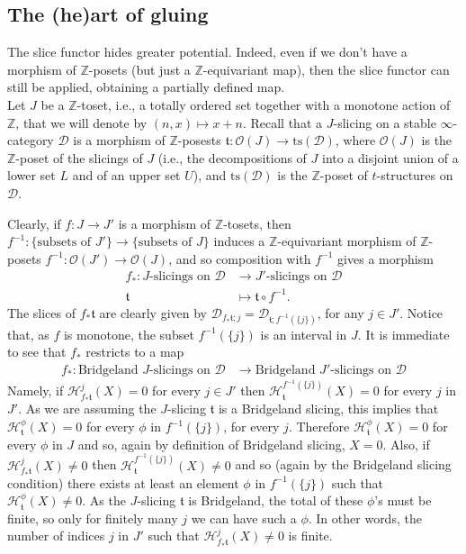 \documentclass{article}
\theoremstyle{definition}
\newcommand{\Z}{\mathbb{Z}}
\newcommand{\Oo}{\mathcal{O}}
\newcommand{\ts}{\mathrm{ts}}
\newcommand{\tee}{\mathfrak{t}}
\begin{document}
\begin{titlepage}
\end{titlepage}




\subsection{The (he)art of gluing} The slice functor hides greater potential. Indeed, even if we don't have a morphism of $\mathbb{Z}$-posets (but just a $\mathbb{Z}$-equivariant map), then the slice functor can still be applied, obtaining a partially defined map. \\

Let $J$ be a $\Z$-toset, i.e., a totally ordered set together with a monotone action of $\Z$, that we will denote by $(n,x)\mapsto x+n$. Recall that a $J$-slicing on a stable $\infty$-category $\mathscr{D}$ is a morphism of $\Z$-posests $\tee\colon \Oo(J)\to \ts(\mathscr{D})$, where $\Oo(J)$ is the $\Z$-poset of the slicings of $J$ (i.e., the decompositions of $J$ into a disjoint union of a lower set $L$ and of an upper set $U$), and $\ts(\mathscr{D})$ is the $\Z$-poset of $t$-structures on $\mathscr{D}$.

Clearly, if $f\colon J\to J'$ is a morphism of $\Z$-tosets, then $f^{-1}\colon \{\text{subsets of $J'$}\}\to \{\text{subsets of $J$}\}$ induces a $\Z$-equivariant morphism of $\Z$-posets $f^{-1}\colon \Oo(J')\to \Oo(J)$, and so composition with $f^{-1}$ gives a morphism
\begin{align*}
f_*\colon J\text{-slicings on $\mathscr{D}$}&\to J'\text{-slicings on $\mathscr{D}$}\\
\tee&\mapsto \tee\circ f^{-1}.
\end{align*}
The slices of $f_*\tee$ are clearly given by $\mathscr{D}_{f_*\tee;j}=\mathscr{D}_{\tee;f^{-1}(\{j\})}$, for any $j\in J'$. Notice that, as $f$ is monotone, the subset $f^{-1}(\{j\})$ is an interval in $J$. It is immediate to see that $f_*$ restricts to a map
\begin{align*}
f_*\colon \text{Bridgeland $J$-slicings on $\mathscr{D}$}&\to \text{Bridgeland $J'$-slicings on $\mathscr{D}$}
\end{align*}
Namely, if $\mathcal{H}^j_{f_*\tee}(X)=0$ for every $j\in J'$ then $\mathcal{H}^{f^{-1}(\{j\})}_{\tee}(X)=0$ for every $j$ in $J'$. As we are assuming the $J$-slicing $\tee$ is a Bridgeland slicing, this implies that $\mathcal{H}^{\phi}_{\tee}(X)=0$ for every $\phi$ in $f^{-1}(\{j\})$, for every $j$. Therefore $\mathcal{H}^{\phi}_{\tee}(X)=0$ for every $\phi$ in $J$ and so, again by definition of Bridgeland slicing, $X=0$. Also, if $\mathcal{H}^j_{f_*\tee}(X)\neq 0$ then $\mathcal{H}^{f^{-1}(\{j\})}_{\tee}(X)\neq 0$ and so (again by the Bridgeland slicing condition) there exists at least an element $\phi$ in $f^{-1}(\{j\})$ such that $\mathcal{H}^{\phi}_{\tee}(X)\neq 0$. As the $J$-slicing $\tee$ is Bridgeland, the total of these $\phi$'s must be finite, so only for finitely many $j$ we can have such a $\phi$. In other words, the number of indices $j$ in $J'$ such that $\mathcal{H}^j_{f_*\tee}(X)\neq 0$ is finite.
\end{document}
